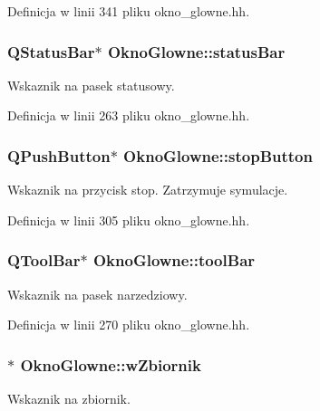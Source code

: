 Definicja w linii 341 pliku okno\-\_\-glowne.\-hh.

\hypertarget{class_okno_glowne_a40a10989bc6b318ac24e2457d7adb53b}{
\subsubsection[{status\-Bar}]{\setlength{\rightskip}{0pt plus 5cm}Q\-Status\-Bar$\ast$ Okno\-Glowne\-::status\-Bar\hspace{0.3cm}{\ttfamily [private]}}}\label{class_okno_glowne_a40a10989bc6b318ac24e2457d7adb53b}
Wskaznik na pasek statusowy. 

Definicja w linii 263 pliku okno\-\_\-glowne.\-hh.

\hypertarget{class_okno_glowne_a3051d73dc0e0a27dc30ada43cc6b63c4}{
\subsubsection[{stop\-Button}]{\setlength{\rightskip}{0pt plus 5cm}Q\-Push\-Button$\ast$ Okno\-Glowne\-::stop\-Button\hspace{0.3cm}{\ttfamily [private]}}}\label{class_okno_glowne_a3051d73dc0e0a27dc30ada43cc6b63c4}
Wskaznik na przycisk stop. Zatrzymuje symulacje. 

Definicja w linii 305 pliku okno\-\_\-glowne.\-hh.

\hypertarget{class_okno_glowne_a6a37dd1f32605092fff7feac712bf429}{
\subsubsection[{tool\-Bar}]{\setlength{\rightskip}{0pt plus 5cm}Q\-Tool\-Bar$\ast$ Okno\-Glowne\-::tool\-Bar\hspace{0.3cm}{\ttfamily [private]}}}\label{class_okno_glowne_a6a37dd1f32605092fff7feac712bf429}
Wskaznik na pasek narzedziowy. 

Definicja w linii 270 pliku okno\-\_\-glowne.\-hh.

\hypertarget{class_okno_glowne_af2d1275209898ebdd5ab9de8ef78dffd}{
\subsubsection[{w\-Zbiornik}]{$\ast$ Okno\-Glowne\-::w\-Zbiornik\hspace{0.3cm}{\ttfamily [private]}}}\label{class_okno_glowne_af2d1275209898ebdd5ab9de8ef78dffd}
Wskaznik na zbiornik. 

